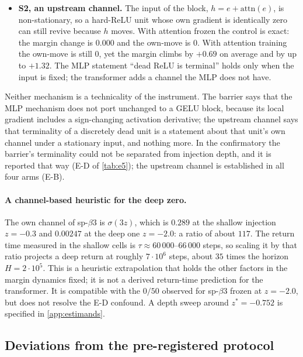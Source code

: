 \documentclass[11pt]{article}
\theoremstyle{definition}
\theoremstyle{remark}
\begin{document}
\begin{itemize}
\item \textbf{S2, an upstream channel.} The input of the block,
$h=e+\mathrm{attn}(e)$, is non-stationary, so a hard-ReLU unit whose own gradient
is identically zero can still revive because $h$ moves. With attention frozen the
control is exact: the margin change is $0.000$ and the own-move is $0$. With
attention training the own-move is still $0$, yet the margin climbs by $+0.69$ on
average and by up to $+1.32$. The MLP statement ``dead ReLU is terminal'' holds
only when the input is fixed; the transformer adds a channel the MLP does not
have.
\end{itemize}

Neither mechanism is a technicality of the instrument. The barrier says that the
MLP mechanism does not port unchanged to a GELU block, because its local gradient includes a sign-changing activation derivative; the upstream channel says that
terminality of a discretely dead unit is a statement about that unit's own
channel under a stationary input, and nothing more. In the confirmatory the
barrier's terminality could not be separated from injection depth, and it is
reported that way (E-D of \cref{tab:e5}); the upstream channel is established in
all four arms (E-B).

\paragraph{A channel-based heuristic for the deep zero.} The own channel of
sp-$\beta3$ is $\sigma(3z)$, which is $0.289$ at the shallow injection
$z=-0.3$ and $0.00247$ at the deep one $z=-2.0$: a ratio of about $117$. The
return time measured in the shallow cells is $\tau\approx60\,000$--$66\,000$
steps, so scaling it by that ratio projects a deep return at roughly
$7\cdot10^{6}$ steps, about $35$ times the horizon $H=2\cdot10^{5}$. This is a heuristic extrapolation that holds the other factors in the
margin dynamics fixed; it is not a derived return-time prediction for the
transformer. It is compatible with the $0/50$ observed for sp-$\beta3$ frozen
at $z=-2.0$, but does not resolve the E-D confound. A depth sweep around
$z^\ast=-0.752$ is specified in \cref{app:estimands}.

\subsection{Deviations from the pre-registered protocol}\label{sec:deviations}
\end{document}
